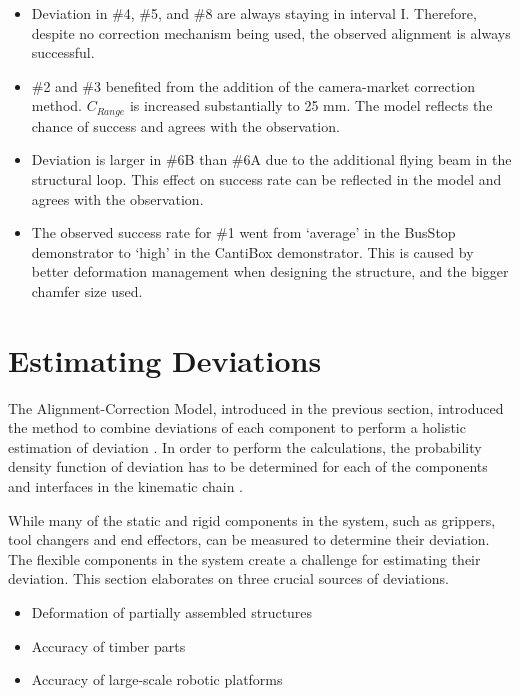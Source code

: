 \begin{itemize}
	\item Deviation in \#4, \#5, and \#8 are always staying in interval I. Therefore, despite no correction mechanism being used, the observed alignment is always successful. 

	\item \#2 and \#3 benefited from the addition of the camera-market correction method. $C_{Range}$ is increased substantially to 25 mm. The model reflects the chance of success and agrees with the observation.

	\item Deviation is larger in \#6B than \#6A due to the additional flying beam in the structural loop. This effect on success rate can be reflected in the model and agrees with the observation.

	\item The observed success rate for \#1 went from ‘average’ in the BusStop demonstrator to ‘high’ in the CantiBox demonstrator. This is caused by better deformation management when designing the structure, and the bigger chamfer size used. 
\end{itemize}

\section{Estimating Deviations}
\label{section:estimating-deviations}

The Alignment-Correction Model, introduced in the previous section, introduced the method to combine deviations of each component to perform a holistic estimation of deviation . In order to perform the calculations, the probability density function of deviation has to be determined for each of the components and interfaces in the kinematic chain .

While many of the static and rigid components in the system, such as grippers, tool changers and end effectors, can be measured to determine their deviation. The flexible components in the system create a challenge for estimating their deviation. This section elaborates on three crucial sources of deviations.

\begin{itemize}[nosep]
	\item Deformation of partially assembled structures
	\item Accuracy of timber parts
	\item Accuracy of large-scale robotic platforms
\end{itemize}


